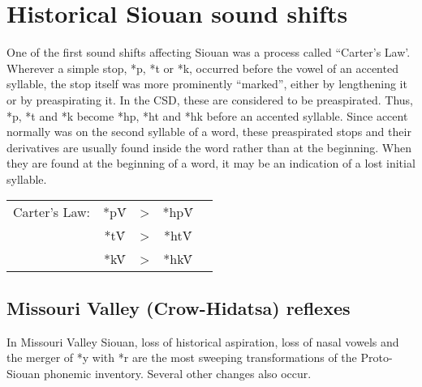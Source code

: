 \documentclass[output=paper]{LSP/langsci}
\begin{document}
\section{Historical Siouan sound shifts}

One of the first sound shifts affecting Siouan was a process called ``Carter's Law'.  Wherever a simple stop, *p, *t or *k, occurred before the vowel of an accented syllable, the stop itself was more prominently ``marked'', either by lengthening it or by preaspirating it.  In the CSD, these are considered to be preaspirated.  Thus, *p, *t and *k become *hp, *ht and *hk before an accented syllable.  Since accent normally was on the second syllable of a word, these preaspirated stops and their derivatives are usually found inside the word rather than at the beginning.  When they are found at the beginning of a word, it may be an indication of a lost initial syllable.


\begin{tabular}[t]{c c c c c }

Carter's Law: & *p\'V & > & *hp\'V  \\

& *t\'V & >  & *ht\'V \\

&  *k\'V & >  & *hk\'V\\
\end{tabular}

\subsection{Missouri Valley (Crow-Hidatsa) reflexes}

In Missouri Valley Siouan, loss of historical aspiration, loss of nasal vowels and the merger of *y with *r are the most sweeping transformations of the Proto-Siouan phonemic inventory.  Several other changes also occur.
\end{document}
